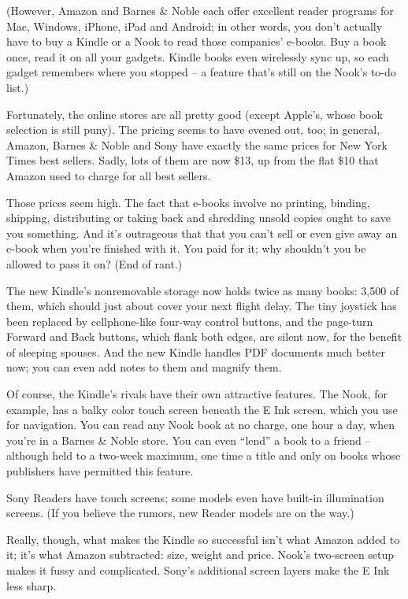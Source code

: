 ﻿\documentclass[12pt]{article}
\begin{document}
(However, Amazon and Barnes \& Noble each offer excellent reader programs for Mac, Windows, iPhone,
iPad and Android; in other words, you don't actually have to buy a Kindle or a Nook to read those
companies' e-books. Buy a book once, read it on all your gadgets. Kindle books even wirelessly sync
up, so each gadget remembers where you stopped -- a feature that's still on the Nook's to-do list.)

Fortunately, the online stores are all pretty good (except Apple's, whose book selection is still
puny). The pricing seems to have evened out, too; in general, Amazon, Barnes \& Noble and Sony have
exactly the same prices for New York Times best sellers. Sadly, lots of them are now \$13, up from
the flat \$10 that Amazon used to charge for all best sellers.

Those prices seem high. The fact that e-books involve no printing, binding, shipping, distributing
or taking back and shredding unsold copies ought to save you something. And it's outrageous that
that you can't sell or even give away an e-book when you're finished with it. You paid for it; why
shouldn't you be allowed to pass it on? (End of rant.)

The new Kindle's nonremovable storage now holds twice as many books: 3,500 of them, which should
just about cover your next flight delay. The tiny joystick has been replaced by cellphone-like
four-way control buttons, and the page-turn Forward and Back buttons, which flank both edges, are
silent now, for the benefit of sleeping spouses. And the new Kindle handles PDF documents much
better now; you can even add notes to them and magnify them.

Of course, the Kindle's rivals have their own attractive features. The Nook, for example, has a
balky color touch screen beneath the E Ink screen, which you use for navigation. You can read any
Nook book at no charge, one hour a day, when you're in a Barnes \& Noble store. You can even
``lend'' a book to a friend -- although held to a two-week maximum, one time a title and only on
books whose publishers have permitted this feature.

Sony Readers have touch screens; some models even have built-in illumination screens. (If you
believe the rumors, new Reader models are on the way.)

Really, though, what makes the Kindle so successful isn't what Amazon added to it; it's what Amazon
subtracted: size, weight and price. Nook's two-screen setup makes it fussy and complicated. Sony's
additional screen layers make the E Ink less sharp.
\end{document}
